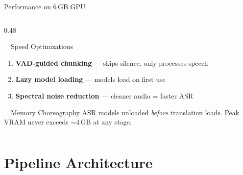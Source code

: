 \documentclass[aspectratio=169, 11pt]{beamer}
\begin{document}
\begin{frame}{Performance on 6\,GB GPU}
\begin{columns}[T]
\begin{column}{0.48\textwidth}
\begin{block}{\faRocket\ \ Speed Optimizations}
\begin{enumerate}
                    \item \textbf{VAD-guided chunking} --- skips silence, only processes speech
                    \item \textbf{Lazy model loading} --- models load on first use
                    \item \textbf{Spectral noise reduction} --- cleaner audio = faster ASR
                \end{enumerate}
            \end{block}
            \vspace{0.2em}
            \begin{alertblock}{\scriptsize\faMemory\ \ Memory Choreography}
                \scriptsize
                ASR models unloaded \textit{before} translation loads.
                Peak VRAM never exceeds $\sim$4\,GB at any stage.
            \end{alertblock}
        \end{column}
    \end{columns}
\end{frame}

\section{Pipeline Architecture}
\end{document}
